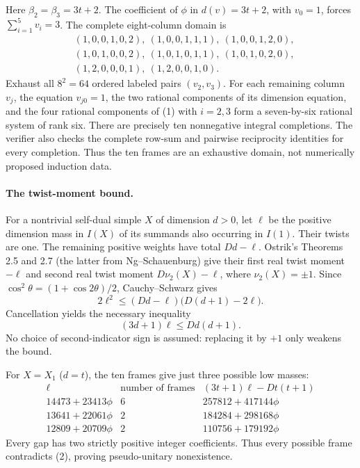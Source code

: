 \documentclass{article}
\begin{document}
Here $\beta_2=\beta_3=3t+2$. The coefficient of $\phi$ in
$d(v)=3t+2$, with $v_0=1$, forces $\sum_{i=1}^5v_i=3$.
The complete eight-column domain is
\[
\begin{split}
 &(1,0,0,1,0,2),\ (1,0,0,1,1,1),\ (1,0,0,1,2,0),\\
 &(1,0,1,0,0,2),\ (1,0,1,0,1,1),\ (1,0,1,0,2,0),\\
 &(1,2,0,0,0,1),\ (1,2,0,0,1,0).
\end{split}
\]
Exhaust all $8^2=64$ ordered labeled pairs $(v_2,v_3)$.
For each remaining column $v_j$, the equation $v_{j0}=1$, the two rational
components of its dimension equation, and the four rational components of
(1) with $i=2,3$ form a seven-by-six rational system of rank six.
There are precisely ten nonnegative integral completions. The verifier
also checks the complete row-sum and pairwise reciprocity identities for
every completion. Thus the ten frames are an exhaustive domain, not
numerically proposed induction data.

\paragraph{The twist-moment bound.}
For a nontrivial self-dual simple $X$ of dimension $d>0$, let $\ell$ be the
positive dimension mass in $I(X)$ of its summands also occurring in $I(1)$.
Their twists are one. The remaining positive weights have total $Dd-\ell$.
Ostrik's Theorems 2.5 and 2.7 (the latter from Ng--Schauenburg) give their
first real twist moment $-\ell$ and second real twist moment
$D\nu_2(X)-\ell$, where $\nu_2(X)=\pm1$. Since
$\cos^2\theta=(1+\cos2\theta)/2$, Cauchy--Schwarz gives
\[
 2\ell^2\le (Dd-\ell)\bigl(D(d+1)-2\ell\bigr).
\]
Cancellation yields the necessary inequality
\[
 (3d+1)\ell\le Dd(d+1). \tag{2}
\]
No choice of second-indicator sign is assumed: replacing it by $+1$ only
weakens the bound.

For $X=X_1$ ($d=t$), the ten frames give just three possible low masses:
\[
\begin{array}{c|c|c}
\ell&\text{number of frames}&(3t+1)\ell-Dt(t+1)\\\hline
14473+23413\phi&6&257812+417144\phi\\
13641+22061\phi&2&184284+298168\phi\\
12809+20709\phi&2&110756+179192\phi
\end{array}
\]
Every gap has two strictly positive integer coefficients. Thus every
possible frame contradicts (2), proving pseudo-unitary nonexistence.
\end{document}
